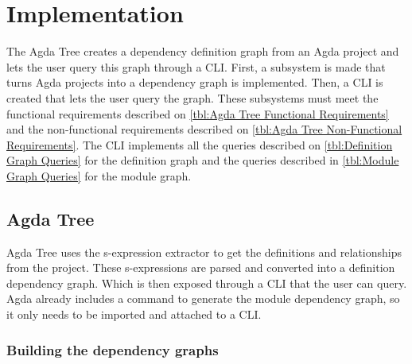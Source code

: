 
\chapter{Implementation} \label{ch:implementation}

The Agda Tree creates a dependency definition graph from an Agda project and
lets the user query this graph through a CLI. First, a subsystem  is made that
turns Agda projects into a dependency graph is implemented. Then, a CLI is
created that lets the user query the graph. These subsystems must meet the
functional requirements described on \cref{tbl:Agda Tree Functional
Requirements} and the non-functional requirements described on \cref{tbl:Agda
Tree Non-Functional Requirements}. The CLI implements all the queries described
on \cref{tbl:Definition Graph Queries} for the definition graph and the queries
described in \cref{tbl:Module Graph Queries} for the module graph.





\section{Agda Tree}

Agda Tree uses the s-expression extractor \cite{andrej} to get the definitions
and relationships from the project. These s-expressions are parsed and
converted into a definition dependency graph. Which is then exposed through a
CLI that the user can query. Agda already includes a command to generate the
module dependency graph, so it only needs to be imported and attached to a CLI.

\subsection{Building the dependency graphs}

